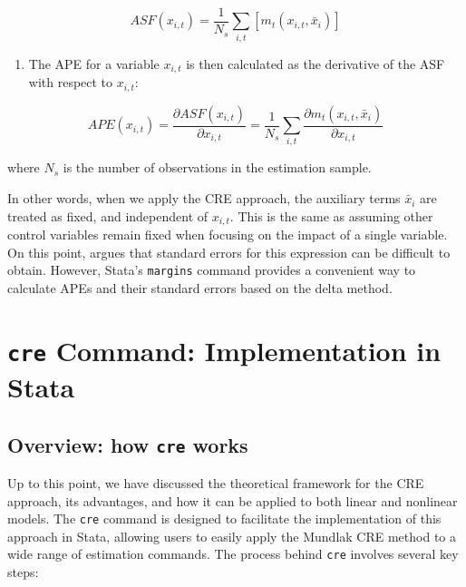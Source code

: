 \documentclass[bib]{statapress}
\providecommand{\tightlist}{%
  \setlength{\itemsep}{0pt}\setlength{\parskip}{0pt}}\usepackage{longtable,booktabs,array}
\begin{document}
\[ASF(x_{i,t}) = \frac{1}{N_s} \sum_{i,t} [ m_t(x_{i,t}, \bar x_i)]\]

\begin{enumerate}
\def\labelenumi{\arabic{enumi}.}
\setcounter{enumi}{2}
\tightlist
\item
  The APE for a variable \(x_{i,t}\) is then calculated as the
  derivative of the ASF with respect to \(x_{i,t}\):
\end{enumerate}

\[APE(x_{i,t}) = \frac{\partial ASF(x_{i,t})}{\partial x_{i,t}} = \frac{1}{N_s} \sum_{i,t} \frac{\partial m_t(x_{i,t}, \bar x_i)}{\partial x_{i,t}}\]

where \(N_s\) is the number of observations in the estimation sample.

In other words, when we apply the CRE approach, the auxiliary terms
\(\bar x_i\) are treated as fixed, and independent of \(x_{i,t}\). This
is the same as assuming other control variables remain fixed when
focusing on the impact of a single variable. On this point,
\citet{wooldridge2019} argues that standard errors for this expression
can be difficult to obtain. However, Stata's \texttt{margins} command
provides a convenient way to calculate APEs and their standard errors
based on the delta method.

\section{\texorpdfstring{\texttt{cre} Command: Implementation in
Stata}{cre Command: Implementation in Stata}}\label{sec-3}

\subsection{\texorpdfstring{Overview: how \texttt{cre}
works}{Overview: how cre works}}\label{overview-how-cre-works}

Up to this point, we have discussed the theoretical framework for the
CRE approach, its advantages, and how it can be applied to both linear
and nonlinear models. The \texttt{cre} command is designed to facilitate
the implementation of this approach in Stata, allowing users to easily
apply the Mundlak CRE method to a wide range of estimation commands. The
process behind \texttt{cre} involves several key steps:
\end{document}
